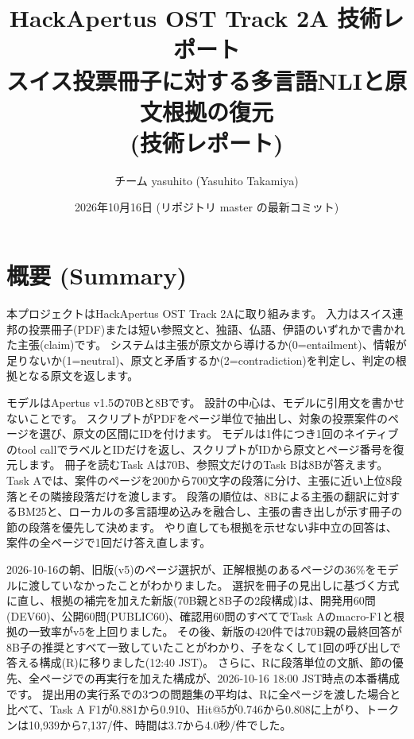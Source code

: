\documentclass[10pt,a4paper]{ltjsarticle}
\title{HackApertus OST Track 2A 技術レポート\\
  \large スイス投票冊子に対する多言語NLIと原文根拠の復元\\
  \normalsize (技術レポート)}
\author{チーム yasuhito (Yasuhito Takamiya)}
\date{2026年10月16日 (リポジトリ master の最新コミット)}
\begin{document}
\maketitle

\begin{center}
\end{center}

\section{概要 (Summary)}

本プロジェクトはHackApertus OST Track 2A\cite{ostchallenge}に取り組みます。
入力はスイス連邦の投票冊子(PDF)または短い参照文と、独語、仏語、伊語のいずれかで書かれた主張(claim)です。
システムは主張が原文から導けるか(0=entailment)、情報が足りないか(1=neutral)、原文と矛盾するか(2=contradiction)を判定し、判定の根拠となる原文を返します。

モデルはApertus v1.5の70Bと8Bです\cite{apertus,apertus70b,apertus8b}。
設計の中心は、モデルに引用文を書かせないことです。
スクリプトがPDFをページ単位で抽出し、対象の投票案件のページを選び、原文の区間にIDを付けます。
モデルは1件につき1回のネイティブのtool callでラベルとIDだけを返し、スクリプトがIDから原文とページ番号を復元します。
冊子を読むTask Aは70B、参照文だけのTask Bは8Bが答えます。
Task Aでは、案件のページを200から700文字の段落に分け、主張に近い上位8段落とその隣接段落だけを渡します。
段落の順位は、8Bによる主張の翻訳に対するBM25と、ローカルの多言語埋め込みを融合し、主張の書き出しが示す冊子の節の段落を優先して決めます。
やり直しても根拠を示せない非中立の回答は、案件の全ページで1回だけ答え直します。

2026-10-16の朝、旧版(v5)のページ選択が、正解根拠のあるページの36\%をモデルに渡していなかったことがわかりました。
選択を冊子の見出しに基づく方式に直し、根拠の補完を加えた新版(70B親と8B子の2段構成)は、開発用60問(DEV60)、公開60問(PUBLIC60)、確認用60問のすべてでTask Aのmacro-F1と根拠の一致率がv5を上回りました。
その後、新版の420件では70B親の最終回答が8B子の推奨とすべて一致していたことがわかり、子をなくして1回の呼び出しで答える構成(R)に移りました(12:40 JST)。
さらに、Rに段落単位の文脈、節の優先、全ページでの再実行を加えた構成が、2026-10-16 18:00 JST時点の本番構成です。
提出用の実行系での3つの問題集の平均は、Rに全ページを渡した場合と比べて、Task A F1が0.881から0.910、Hit@5が0.746から0.808に上がり、トークンは10,939から7,137/件、時間は3.7から4.0秒/件でした。
\end{document}
